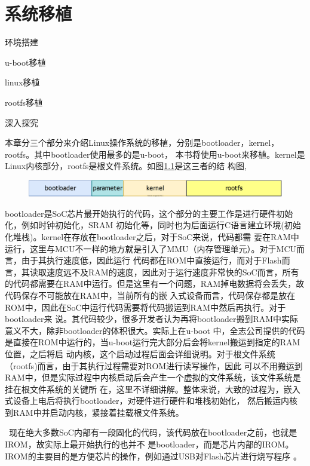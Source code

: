 \chapter{系统移植}
\begin{introduction}
	\item 环境搭建
	\item u-boot移植
	\item linux移植
	\item rootfs移植
	\item 深入探究
\end{introduction}
本章分三个部分来介绍Linux操作系统的移植，分别是bootloader，kernel，rootfs。其中bootloader使用最多的是u-boot，
本书将使用u-boot来移植。kernel是Linux内核部分，rootfs是根文件系统。如图\ref{fig:struction}是这三者的结
构图,
\begin{figure}[htbp]
	\centering
	\includegraphics[width=0.8\linewidth]{chapter2/img/1}
	\caption{}
	\label{fig:struction}
\end{figure}
bootloader是SoC芯片最开始执行的代码，这个部分的主要工作是进行硬件初始化，例如时钟初始化，SRAM
初始化等，同时也为后面运行C语言建立环境(初始化堆栈)。kernel在存放在bootloader之后，对于SoC来说，代码都需
要在RAM中运行，这里与MCU不一样的地方就是引入了MMU（内存管理单元）。对于MCU而言，由于其执行速度低，因此运行
代码都在ROM中直接运行，而对于Flash而言，其读取速度远不及RAM的速度，因此对于运行速度非常快的SoC而言，所有
的代码都需要在RAM中运行。但是这里有一个问题，RAM掉电数据将会丢失，故代码保存不可能放在RAM中，当前所有的嵌
入式设备而言，代码保存都是放在ROM中，因此在SoC中运行代码需要将代码搬运到RAM中然后再执行。对于bootloader来
说。其代码较少，很多开发者认为再将bootloader搬到RAM中实际意义不大，除非bootloader的体积很大。实际上在u-boot
中，全志公司提供的代码是直接在ROM中运行的，当u-boot运行完大部分后会将kernel搬运到指定的RAM位置，之后将启
动内核，这个启动过程后面会详细说明。对于根文件系统（rootfs)而言，由于其执行过程需要对ROM进行读写操作，因此
可以不用搬运到RAM中，但是实际过程中内核启动后会产生一个虚拟的文件系统，该文件系统是挂在根文件系统的关键所
在，这里不详细讲解。整体来说，大致的过程为，嵌入式设备上电后将执行bootloader，对硬件进行硬件和堆栈初始化，
然后搬运内核到RAM中并启动内核，紧接着挂载根文件系统。
\begin{tcolorbox}[colback=red!5!white,colframe=red!75!black]
\faWarning \ 
现在绝大多数SoC内部有一段固化的代码，该代码放在bootloader之前，也就是IROM，故实际上最开始执行的也并不
是bootloader，而是芯片内部的IROM。IROM的主要目的是方便芯片的操作，例如通过USB对Flash芯片进行烧写程序
。
\end{tcolorbox}

